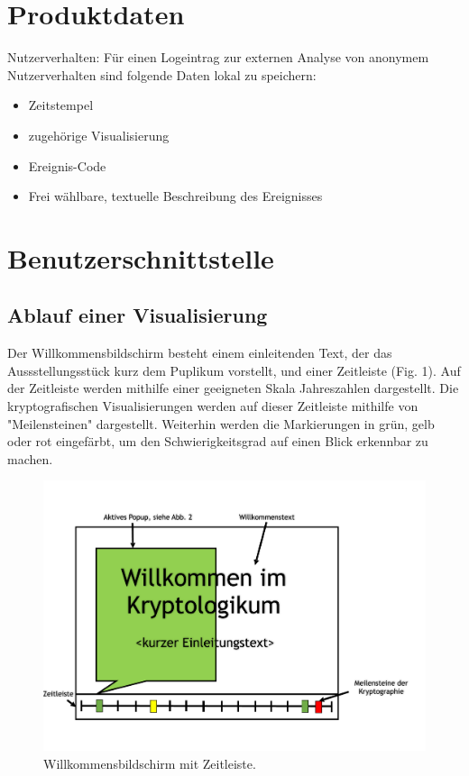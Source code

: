 \documentclass{article}
\begin{document}
\section{Produktdaten}
\begin{PD}[start=10]
  \item Nutzerverhalten: Für einen Logeintrag zur externen Analyse von anonymem Nutzerverhalten sind folgende Daten lokal zu speichern:
  \begin{itemize}
    \item Zeitstempel
    \item zugehörige Visualisierung
    \item Ereignis-Code
    \item Frei wählbare, textuelle Beschreibung des Ereignisses
  \end{itemize}
\end{PD}

\section{Benutzerschnittstelle}

\subsection{Ablauf einer Visualisierung}

Der Willkommensbildschirm besteht einem einleitenden Text, der das Aussstellungsstück kurz dem Puplikum vorstellt, und einer Zeitleiste (Fig. 1). Auf der Zeitleiste werden mithilfe einer geeigneten Skala Jahreszahlen dargestellt. Die kryptografischen Visualisierungen werden auf dieser Zeitleiste mithilfe von "Meilensteinen" dargestellt. Weiterhin werden die Markierungen in grün, gelb oder rot eingefärbt, um den Schwierigkeitsgrad auf einen Blick erkennbar zu machen.

\begin{figure}[H]
  \centering
    \includegraphics[width=\textwidth]{resources/ui_walkthrough_start-draft}
  \caption{Willkommensbildschirm mit Zeitleiste.}
\end{figure}
\end{document}
